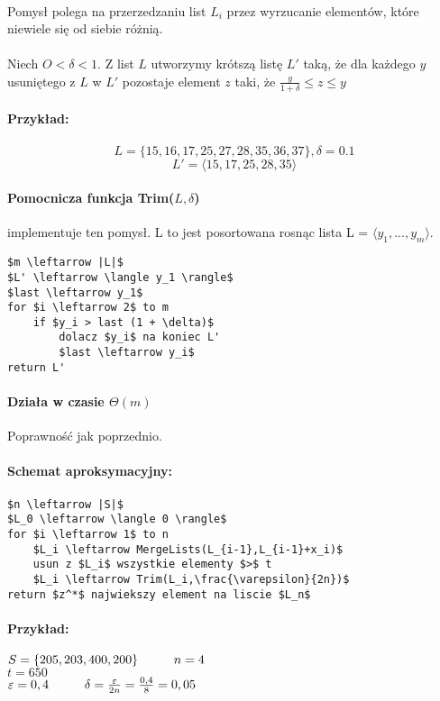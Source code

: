 \paragraph{}{Pomysł polega na przerzedzaniu list $L_i$ przez wyrzucanie elementów, które niewiele się od siebie różnią.}
\paragraph{}{Niech $O<\delta <1$. Z list $L$ utworzymy krótszą listę $L'$ taką, że dla każdego $y$ usuniętego z $L$ w $L'$ pozostaje element $z$ taki, że $\frac{y}{1+\delta}\leq z\leq y$ }
\paragraph{Przykład:\\}{
$$L = \{ 15, 16, 17, 25, 27, 28, 35, 36, 37 \},  \delta = 0.1 $$
$$L' = \langle 15, 17, 25, 28, 35 \rangle $$}

\paragraph{Pomocnicza funkcja Trim($L, \delta$)} implementuje ten pomysł. L to jest posortowana rosnąc lista L = $\langle y_1, ..., y_m \rangle$.

\begin{lstlisting}[caption={Trim(L,$\delta$)}]
$m \leftarrow |L|$
$L' \leftarrow \langle y_1 \rangle$
$last \leftarrow y_1$
for $i \leftarrow 2$ to m
	if $y_i > last (1 + \delta)$
		dolacz $y_i$ na koniec L'
		$last \leftarrow y_i$
return L'
\end{lstlisting}

\paragraph{Działa w czasie $\Theta(m)$}{Poprawność jak poprzednio.}
\paragraph{Schemat aproksymacyjny:}
\begin{lstlisting}[caption={ApproxSubsetSum(S,t,$\varepsilon$)}]
$n \leftarrow |S|$
$L_0 \leftarrow \langle 0 \rangle$
for $i \leftarrow 1$ to n
	$L_i \leftarrow MergeLists(L_{i-1},L_{i-1}+x_i)$
	usun z $L_i$ wszystkie elementy $>$ t
	$L_i \leftarrow Trim(L_i,\frac{\varepsilon}{2n})$
return $z^*$ najwiekszy element na liscie $L_n$
\end{lstlisting}
\paragraph{Przykład:}{$S=\lbrace 205, 203, 400, 200\rbrace \hspace*{1cm} n=4$ \\ $t=650$ \\ $\varepsilon = 0,4 \hspace*{1cm} \delta=\frac{\varepsilon}{2n}=\frac{0,4}{8}=0,05$}

